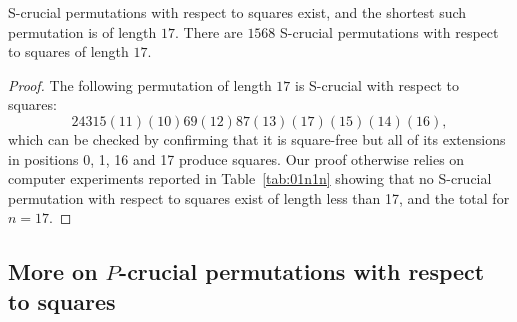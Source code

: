 \documentclass[12pt,reqno]{article}
\begin{document}
\begin{theorem} S-crucial permutations with respect to squares exist, and the shortest such permutation is of length $17$. There are $1568$ S-crucial permutations with respect to squares of length $17$. \end{theorem}

\begin{proof} The following permutation of length $17$ is S-crucial with respect to squares:
$$2 4 3 1 5 (11) (10) 6 9 (12) 8 7 (13) (17) (15) (14) (16),$$
which can be checked by confirming that it is square-free but all of its extensions in positions 0, 1, 16 and 17 produce squares. Our proof otherwise relies on computer experiments reported in Table~\ref{tab:01n1n} showing that no S-crucial permutation with respect to squares exist of length less than 17, and the total for $n=17$.  
\end{proof}

\begin{table}[H]
\begin{center}
\caption{$P$-crucial permutations with respect to squares.}\label{P-crucial}
\end{center}
\end{table}

\subsection{More on $P$-crucial permutations with respect to squares}
\end{document}
